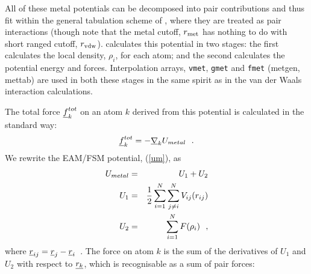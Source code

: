 All of these metal potentials can be decomposed into pair
contributions and thus fit within the general tabulation scheme of \D{},
where they are treated as pair interactions (though note that the
metal cutoff, $r_{\rm met}$ has nothing to do with short ranged cutoff,
$r_{\rm vdw}$).  \D{} calculates this potential in two stages: the first
calculates the local density, $\rho_{i}$, for each atom; and the
second calculates the potential energy and forces.  Interpolation
arrays, {\tt vmet}, {\tt gmet} and {\tt fmet} ({\sc metgen},
{\sc mettab}) are used in both these stages in the same
spirit as in the van der Waals interaction calculations.

The total force $\mbox{$\underline{f}$}_{k}^{tot}$ on an atom $k$ derived from this
potential is calculated in the standard way:
\begin{equation}
\mbox{$\underline{f}$}_{k}^{tot} = -\mbox{$\underline{\nabla}$}_{k} U_{metal}~~.
\end{equation}
We rewrite the EAM/FSM potential, (\ref{um}), as
\begin{eqnarray}
U_{metal} &=& U_{1} + U_{2} \nonumber \\
U_{1} &=& {1 \over 2} \sum_{i=1}^{N} \sum_{j \ne i}^{N} V_{ij}(r_{ij}) \\
U_{2} &=& \sum_{i=1}^{N} F(\rho_{i})~~, \nonumber
\end{eqnarray}
where $\mbox{$\underline{r}$}_{ij} = \mbox{$\underline{r}$}_{j}-\mbox{$\underline{r}$}_{i}$~.
The force on atom $k$ is the sum of the derivatives of $U_{1}$
and $U_{2}$ with respect to $\mbox{$\underline{r_{k}}$}$, which is recognisable as
a sum of pair forces:
